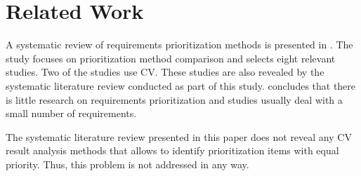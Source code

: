 \section{Related Work\label{relatedwork}}

A systematic review of requirements prioritization methods is presented in \citep{Khan2006}. The study focuses on prioritization method comparison and selects eight relevant studies. Two of the studies use CV. These studies are also revealed by the systematic literature review conducted as part of this study. \citet{Khan2006} concludes that there is little research on requirements prioritization and studies usually deal with a small number of requirements.

The systematic literature review presented in this paper does not reveal any CV result analysis methods that allows to identify prioritization items with equal priority. Thus, this problem is not addressed in any way.

